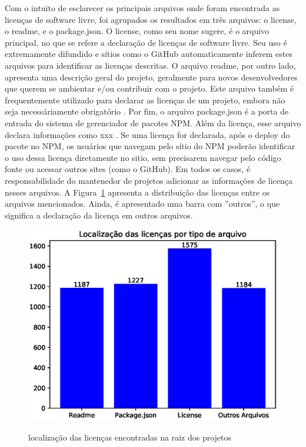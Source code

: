 Com o intuito de esclarecer os principais arquivos onde foram encontrada as licenças de software livre, foi agrupados os resultados em três arquivos: o license, o readme, e o package.json. O license, como seu nome sugere, é o arquivo principal, no que se refere a declaração de licenças de software livre. Seu uso é extremamente difundido  e sítios como o GitHub automaticamente inferem estes arquivos para identificar as licenças descritas. O arquivo readme, por outro lado, apresenta uma descrição geral do projeto, geralmente para novos desenvolvedores que querem se ambientar e/ou contribuir com o projeto. Este arquivo também é frequentemente utilizado para declarar as licenças de um projeto, embora não seja necessáriamente obrigatório . Por fim, o arquivo package.json é a porta de entrada do sistema de gerenciador de pacotes NPM. Além da licença, esse arquivo declara informações como xxx . Se uma licença for declarada, após o deploy do pacote no NPM, os usuários que navegam pelo sítio do NPM poderão identificar o uso dessa licença diretamente no sitio, sem precisarem navegar pelo código fonte ou acessar outros sites (como o GitHub). Em todos os casos, é responsabilidade do mantenedor de projetos adicionar as informações de licença nesses arquivos.
A Figura~\ref{local-licencas-raiz} apresenta a distribuição das licenças entre os arquivos mencionados. Ainda, é apresentado uma barra com ''outros'', o que significa a declaração da licença em outros arquivos.

\begin{figure}[H]
    \centering
    \caption{localização das licenças encontradas na raiz dos projetos}
    \includegraphics[scale=0.8]{figuras/resultados/barras_local_licencas.eps}
    \label{local-licencas-raiz}
\end{figure}

